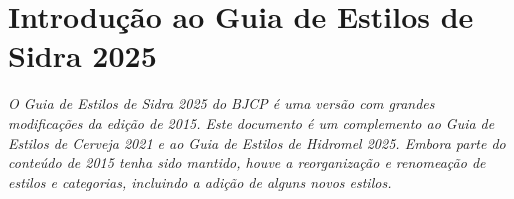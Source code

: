 \section*{Introdução ao Guia de Estilos de Sidra 2025}

\textit{O Guia de Estilos de Sidra 2025 do BJCP é uma versão com grandes modificações da edição de 2015. Este documento é um complemento ao Guia de Estilos de Cerveja 2021 e ao Guia de Estilos de Hidromel 2025. Embora parte do conteúdo de 2015 tenha sido mantido, houve a reorganização e renomeação de estilos e categorias, incluindo a adição de alguns novos estilos.}

